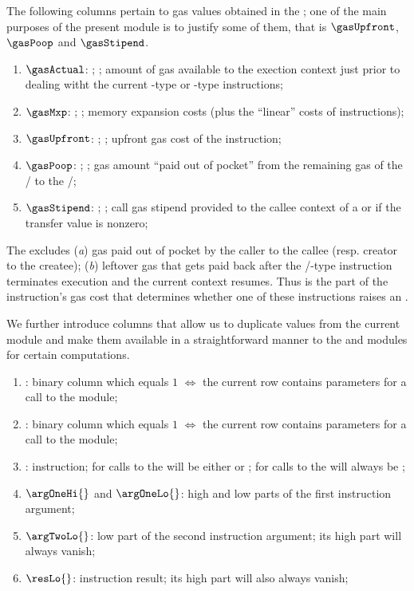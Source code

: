 The following columns pertain to gas values obtained in the \hubMod{};
one of the main purposes of the present module is to justify some of them, that is
$\gasUpfront$, $\gasPoop$ and $\gasStipend$.
\begin{enumerate}[resume]
	\item $\gasActual$: \godGiven{};
		\ccc{}; amount of gas available to the exection context just prior to dealing witht the current -type or -type instructions;
	\item $\gasMxp$: \godGiven{};
		\ccc{}; memory expansion costs (plus the ``linear'' costs of  instructions);
	\item $\gasUpfront$: \godGiven{};
		\ccc{}; upfront gas cost of the instruction;
	\item $\gasPoop$: \godGiven{};
		\ccc{}; gas amount ``paid out of pocket'' from the remaining gas of the \callerr{}/\creator{} to the \calleee{}/\createe{};	
	\item $\gasStipend$: \godGiven{};
		\ccc{}; call gas stipend provided to the callee context of a  or  if the transfer value is nonzero; 
\end{enumerate}
\saNote{}
The \gasUpfront{} excludes
(\emph{a}) gas paid out of pocket by the caller to the callee (resp. creator to the createe);
(\emph{b}) leftover gas that gets paid back after the /-type instruction terminates execution and the current context resumes.
Thus \gasUpfront{} is the part of the instruction's gas cost that determines whether one of these instructions raises an \oogxSH{}.

We further introduce columns that allow us to duplicate values from the current module and make them available in a straightforward manner to the \wcpMod{} and \modMod{} modules for certain computations.
\begin{enumerate}[resume]
	\item \wcpLookupFlag{}:
		binary column which equals $1$ $\iff$ the current row contains parameters for a call to the \wcpMod{} module;
	\item \divLookupFlag{}:
		binary column which equals $1$ $\iff$ the current row contains parameters for a call to the \modMod{} module;
	\item \exoInst{}:
		instruction; for calls to the \wcpMod{} will be either  or ; for calls to the \modMod{} will always be ;
	\item $\argOneHi{}$ and $\argOneLo{}$:
		high and low parts of the first instruction argument;
	\item $\argTwoLo{}$:
		low part of the second instruction argument; its high part will always vanish;
	\item $\resLo{}$:
		instruction result; its high part will also always vanish; 
\end{enumerate}
